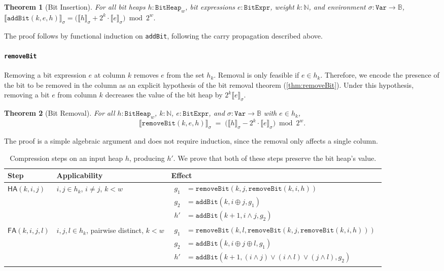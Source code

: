 \documentclass[conference]{IEEEtran}
\newcommand{\sem}[1]{\llbracket #1 \rrbracket}
\newcommand{\csem}[1]{\sem{#1}_{\sigma}}
\newcommand{\hsem}[1]{\llbracket #1 \rrbracket_{\sigma}}
\newcommand{\BitExpr}{\ensuremath{\texttt{BitExpr}}\xspace}
\newcommand{\Heap}{\ensuremath{\texttt{BitHeap}}\xspace}
\newcommand{\HA}{\mathsf{HA}}
\newcommand{\FA}{\mathsf{FA}}
\theoremstyle{plain}
\newtheorem{theorem}{Theorem}
\theoremstyle{definition}
\begin{document}
\begin{theorem}[Bit Insertion]
\label{thm:addBit} 
For all bit heaps $h : \Heap_w$, bit expressions $e : \BitExpr$, weight $k : \mathbb{N}$,
and environment $\sigma : \texttt{Var} \to \mathbb{B}$,
$\hsem{\mathtt{addBit}(k, e, h)}
 =
\bigl(\hsem{h}
      + 2^{k}\cdot \csem{e} \bigr) \bmod 2^{w}.
$
\end{theorem}
The proof follows by functional induction on \texttt{addBit}, following the carry propagation described above.

\paragraph*{\texttt{removeBit}}
Removing a bit expression $e$ at column $k$ removes $e$ from the set $h_k$.
Removal is only feasible if $e\in h_k$.
Therefore, we encode the presence of the bit to be removed in the column as an explicit hypothesis of the bit removal theorem (\autoref{thm:removeBit}).
Under this hypothesis, removing a bit $e$ from column $k$ decreases the value of the bit heap by $2^k \csem{e}$.
\begin{theorem}[Bit Removal]
\label{thm:removeBit}
For all $h : \Heap_w$, $k : \mathbb{N}$, $e : \BitExpr$, and
$\sigma : \texttt{Var} \to \mathbb{B}$ with $e \in h_k$,
\[
  \hsem{\mathtt{removeBit}(k, e, h)}
  \;=\;
  \bigl(\hsem{h}
        - 2^{k}\cdot \csem{e}\bigr) \bmod 2^{w}.
\]
\end{theorem}
The proof is a simple algebraic argument and does not require induction, since the removal only affects a single column.

\begin{table}
  \centering
  \caption{Compression steps on an input heap $h$, producing $h'$. We prove that both of these steps preserve the bit heap's value.}
  \label{tab:steps}
  \begin{tabular}{@{}lll@{}}
  \toprule
  Step & Applicability & Effect \\
  \midrule
  $\HA(k,i,j)$
    & $i,j \in h_k$, $i \neq j$, $k<w$
    & $\begin{aligned}
        g_1 &= \mathtt{removeBit}(k,j,\mathtt{removeBit}(k,i,h)) \\
        g_2 &= \mathtt{addBit}(k,i\oplus j,g_1) \\
        h'  &= \mathtt{addBit}(k+1,i\wedge j,g_2)
      \end{aligned}$ \\[6pt]
\midrule
  $\FA(k,i,j,l)$
    & $i,j,l \in h_k$, pairwise distinct, $k<w$
    & $\begin{aligned}
        g_1 &= \mathtt{removeBit}(k,l,\mathtt{removeBit}(k,j,\mathtt{removeBit}(k,i,h))) \\
        g_2 &= \mathtt{addBit}(k,i\oplus j\oplus l,g_1) \\
        h'  &= \mathtt{addBit}(k+1,(i \wedge j) \vee (i \wedge l) \vee (j \wedge l),g_2)
      \end{aligned}$ \\
  \bottomrule
  \end{tabular}
\end{table}
\end{document}
